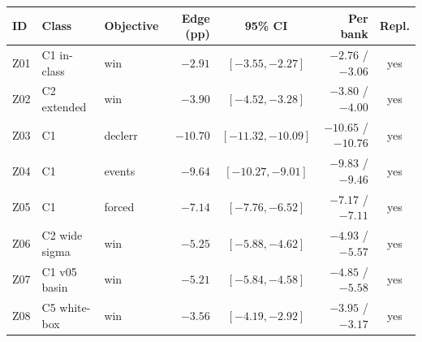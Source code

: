 \begin{tabularx}{\linewidth}{@{}l L l r c r c@{}}
\toprule
ID & Class & Objective & Edge (pp) & 95\% CI & Per bank & Repl. \\
\midrule
Z01 & C1 in-class & win & $-2.91$ & $[-3.55, -2.27]$ & $-2.76$ / $-3.06$ & yes \\
Z02 & C2 extended & win & $-3.90$ & $[-4.52, -3.28]$ & $-3.80$ / $-4.00$ & yes \\
Z03 & C1 & declerr & $-10.70$ & $[-11.32, -10.09]$ & $-10.65$ / $-10.76$ & yes \\
Z04 & C1 & events & $-9.64$ & $[-10.27, -9.01]$ & $-9.83$ / $-9.46$ & yes \\
Z05 & C1 & forced & $-7.14$ & $[-7.76, -6.52]$ & $-7.17$ / $-7.11$ & yes \\
Z06 & C2 wide sigma & win & $-5.25$ & $[-5.88, -4.62]$ & $-4.93$ / $-5.57$ & yes \\
Z07 & C1 v05 basin & win & $-5.21$ & $[-5.84, -4.58]$ & $-4.85$ / $-5.58$ & yes \\
Z08 & C5 white-box & win & $-3.56$ & $[-4.19, -2.92]$ & $-3.95$ / $-3.17$ & yes \\
\bottomrule
\end{tabularx}
